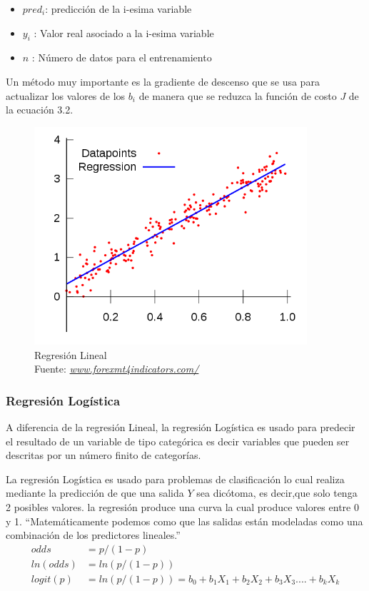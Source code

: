 \begin{itemize}
	\item $pred_{i}$: predicción de la i-esima variable
	\item $y_{i}$   : Valor real asociado a la i-esima variable
	\item $n$       : Número de datos para el entrenamiento
	
\end{itemize}
Un método muy importante es la gradiente de descenso que se usa para actualizar los valores de los $b_{i}$ de manera que se reduzca la función de costo $J$ de la ecuación 3.2.
\begin{figure}[H]
	\centering
	\includegraphics[width=0.9\textwidth]{Figures/Linear.png}
	\caption{Regresión Lineal \\ Fuente:  \href{https://www.forexmt4indicators.com/linear-regression-mt4-indicator/}{\textit{www.forexmt4indicators.com/}}}
	\label{Regresión Lineal}
\end{figure} 

\subsubsection*{Regresión Logística}
A diferencia de la regresión Lineal, la regresión Logística es usado para predecir el resultado de un variable de tipo categórica es decir variables que pueden ser descritas por un número finito de categorías.

 La regresión Logística es usado para problemas de clasificación lo cual realiza mediante la predicción de que una salida $Y$ sea dicótoma, es decir,que solo tenga 2 posibles valores.
 la regresión produce una curva la cual produce valores entre 0 y 1.
 \textquotedblleft Matemáticamente podemos como que las salidas están modeladas como una combinación de los predictores lineales.\textquotedblright \cite{WEBSITE:6}
 \begin{equation}
 \label{eq:t}
 \begin{aligned}
 odds &= p/ (1-p)\\ 
 ln(odds) &= ln(p/(1-p))\\      
 logit(p) &= ln(p/(1-p)) = b_{0}+b_{1}X_{1}+b_{2}X_{2}+b_{3}X_{3}....+b_{k}X_{k}
 \end{aligned}
 \end{equation}
 
